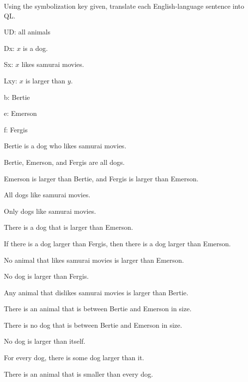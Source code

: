 \solutions
\problempart Using the symbolization key given, translate each English-language sentence into QL.
\label{pr.QLdogtrans}
\begin{ekey}
\item[UD:] all animals
\item[Dx:] $x$ is a dog.
\item[Sx:] $x$ likes samurai movies.
\item[Lxy:] $x$ is larger than $y$.
\item[b:] Bertie
\item[e:] Emerson
\item[f:] Fergis
\end{ekey}
\begin{earg}
\item Bertie is a dog who likes samurai movies.
\item Bertie, Emerson, and Fergis are all dogs.
\item Emerson is larger than Bertie, and Fergis is larger than Emerson.
\item All dogs like samurai movies.
\item Only dogs like samurai movies.
\item There is a dog that is larger than Emerson.
\item If there is a dog larger than Fergis, then there is a dog larger than Emerson.
\item No animal that likes samurai movies is larger than Emerson.
\item No dog is larger than Fergis.
\item Any animal that dislikes samurai movies is larger than Bertie.
\item There is an animal that is between Bertie and Emerson in size.
\item There is no dog that is between Bertie and Emerson in size.
\item No dog is larger than itself.
\item For every dog, there is some dog larger than it.
\item There is an animal that is smaller than every dog.
\end{earg}


